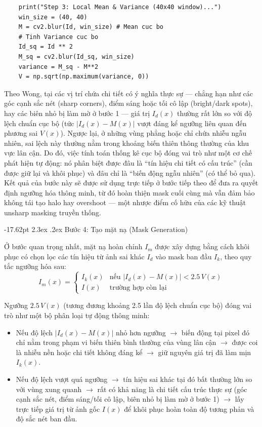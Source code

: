 \documentclass[a4paper]{report}
\makeatletter
\renewcommand\section{\@startsection{section}{1}{\z@}%
    {-17.62pt \@plus -5.89pt \@minus -1.18pt}%
    {2.3ex \@plus .2ex}%
    {\normalfont\fontsize{14.95pt}{16.31pt}\selectfont\bfseries}}%
\makeatother
\begin{document}
\begin{lstlisting}
    print("Step 3: Local Mean & Variance (40x40 window)...")
    win_size = (40, 40)
    M = cv2.blur(Id, win_size) # Mean cuc bo
    # Tinh Variance cuc bo
    Id_sq = Id ** 2
    M_sq = cv2.blur(Id_sq, win_size)
    variance = M_sq - M**2
    V = np.sqrt(np.maximum(variance, 0))
\end{lstlisting}

Theo Wong, tại các vị trí chứa chi tiết có ý nghĩa thực sự --- chẳng hạn như các
góc cạnh sắc nét (sharp corners), điểm sáng hoặc tối cô lập (bright/dark spots),
hay các biên nhỏ bị làm mờ ở bước 1 --- giá trị $I_d(x)$ thường rất lớn so với độ lệch
chuẩn cục bộ (tức $|I_d(x) - M(x)|$ vượt đáng kể ngưỡng liên quan đến phương sai
$V(x)$). Ngược lại, ở những vùng phẳng hoặc chỉ chứa nhiễu ngẫu nhiên, sai lệch
này thường nằm trong khoảng biến thiên thông thường của khu vực lân cận. Do
đó, việc tính toán thống kê cục bộ đóng vai trò như một cơ chế phát hiện tự động:
nó phân biệt được đâu là ``tín hiệu chi tiết có cấu trúc'' (cần được giữ lại và khôi
phục) và đâu chỉ là ``biến động ngẫu nhiên'' (có thể bỏ qua). Kết quả của bước này
sẽ được sử dụng trực tiếp ở bước tiếp theo để đưa ra quyết định ngưỡng hóa thông
minh, từ đó hoàn thiện mask cuối cùng mà vẫn đảm bảo không tái tạo halo hay
overshoot --- một nhược điểm cố hữu của các kỹ thuật unsharp masking truyền
thống.

\section{Bước 4: Tạo mặt nạ (Mask Generation)}

Ở bước quan trọng nhất, mặt nạ hoàn chỉnh $I_m$ được xây dựng bằng cách khôi
phục có chọn lọc các tín hiệu từ ảnh sai khác $I_d$ vào mask ban đầu $I_k$, theo quy
tắc ngưỡng hóa sau:
\[
    I_m(x) =
    \begin{cases}
        I_k(x) & \text{nếu } |I_d(x) - M(x)| < 2.5\,V(x) \\
        I(x)   & \text{trường hợp còn lại}
    \end{cases}
\]

Ngưỡng $2.5\,V(x)$ (tương đương khoảng 2.5 lần độ lệch chuẩn cục bộ) đóng vai trò
như một bộ phân loại tự động thông minh:

\begin{itemize}
    \item Nếu độ lệch $|I_d(x) - M(x)|$ nhỏ hơn ngưỡng $\rightarrow$ biến động tại pixel đó chỉ nằm
          trong phạm vi biến thiên bình thường của vùng lân cận $\rightarrow$ được coi là nhiễu
          nền hoặc chi tiết không đáng kể $\rightarrow$ giữ nguyên giá trị đã làm mịn $I_k(x)$.
    \item Nếu độ lệch vượt quá ngưỡng $\rightarrow$ tín hiệu sai khác tại đó bất thường lớn so với
          vùng xung quanh $\rightarrow$ rất có khả năng là chi tiết cấu trúc thực sự (góc cạnh sắc
          nét, điểm sáng/tối cô lập, biên nhỏ bị làm mờ ở bước 1) $\rightarrow$ lấy trực tiếp giá
          trị từ ảnh gốc $I(x)$ để khôi phục hoàn toàn độ tương phản và độ sắc nét ban
          đầu.
\end{itemize}
\end{document}
